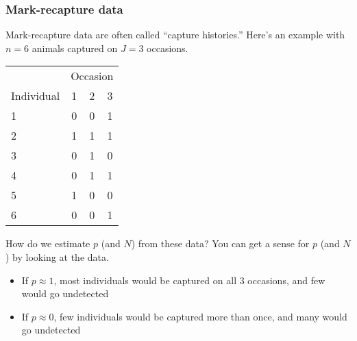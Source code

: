 \documentclass[color=usenames,dvipsnames]{beamer}\usepackage[]{graphicx}\usepackage[]{color}
\begin{document}
\begin{frame}
  \frametitle{Mark-recapture data}
  \small
  Mark-recapture data are often called ``capture histories.'' Here's
  an example with $n=6$ animals captured on $J=3$ occasions. \\
  \centering
  \begin{tabular}{lccc}
    \hline
    & \multicolumn{3}{c}{Occasion} \\
    \cline{2-4}
    Individual & 1 & 2 & 3 \\
    \hline
    1 & 0 & 0 & 1 \\
    2 & 1 & 1 & 1 \\
    3 & 0 & 1 & 0 \\
    4 & 0 & 1 & 1 \\
    5 & 1 & 0 & 0 \\
    6 & 0 & 0 & 1 \\
    \hline
  \end{tabular}
  \pause
  \vfill
  \flushleft
  How do we estimate $p$ (and $N$) from these data? %
  \pause
  You can get a sense for $p$ (and $N$) by looking at the data.
  \begin{itemize}
    \setlength\itemsep{.1pt}
    \item If $p\approx 1$, most individuals would be captured
      on all 3 occasions, and few would go undetected
    \item If $p\approx 0$, few individuals would be captured 
      more than once, and many would go undetected
  \end{itemize}
\end{frame}




\end{document}
